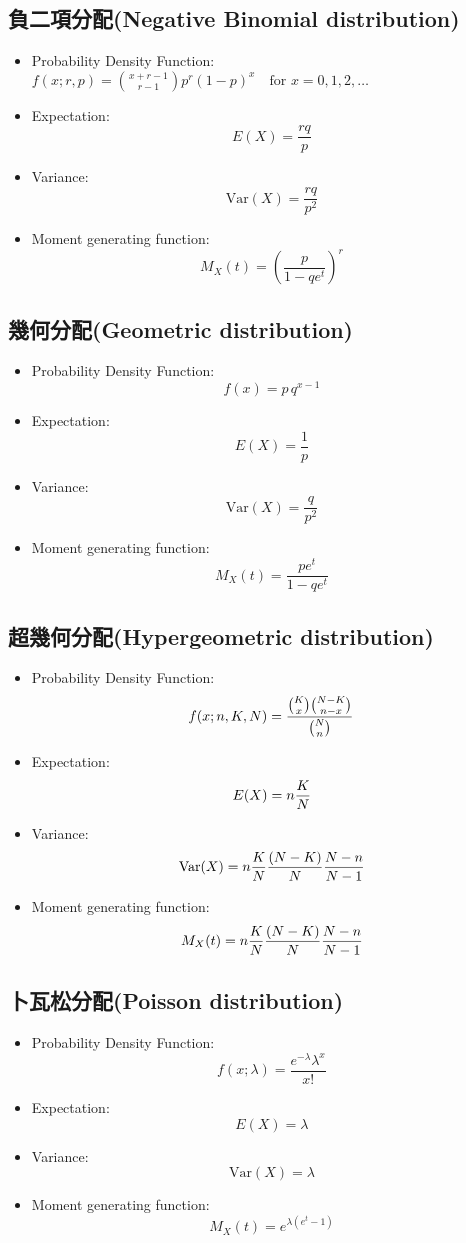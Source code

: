 \subsection{負二項分配(Negative Binomial distribution)}
\begin{itemize}
\item Probability Density Function:${\displaystyle f(x;r,p)={\binom {x+r-1}{r-1}}p^{r}(1-p)^{x}\quad {\text{for }}x=0,1,2,\dotsc }$
\item Expectation:$$E(X) = \frac{rq}{p}$$
\item Variance:$$\text{Var}(X) = \frac{rq}{p^2}$$
\item Moment generating function:$$M_X(t) = \left({\frac  {p}{1-qe^{t}}}\right)^{r}\!$$
\end{itemize}
\subsection{幾何分配(Geometric distribution)}
\begin{itemize}
\item Probability Density Function:$$f(x)=p\,q^{{x-1}}$$
\item Expectation:$$E(X) = \frac{1}{p}$$
\item Variance:$$\text{Var}(X) = \frac{q}{p^2}$$
\item Moment generating function:$$M_X(t) = {\frac  {pe^{t}}{1-qe^{t}}}\!$$
\end{itemize}
\subsection{超幾何分配(Hypergeometric distribution)}
\begin{itemize}
\item Probability Density Function:$${\displaystyle f(x;n,K,N)={{{K \choose x}{{N-K} \choose {n-x}}} \over {N \choose n}}}$$
\item Expectation:$$E(X) = {\displaystyle n{K \over N}}$$
\item Variance:$$\text{Var}(X) = {\displaystyle n{K \over N}{(N-K) \over N}{N-n \over N-1}}$$
\item Moment generating function:$$M_X(t) = {\displaystyle n{K \over N}{(N-K) \over N}{N-n \over N-1}}$$
\end{itemize}
\subsection{卜瓦松分配(Poisson distribution)}
\begin{itemize}
\item Probability Density Function:$$f(x;\lambda)=\frac{e^{-\lambda}\lambda^x}{x!}$$
\item Expectation:$$E(X) = \lambda$$
\item Variance:$$\text{Var}(X) = \lambda$$
\item Moment generating function:$$M_X(t) = e^{\lambda (e^{{t}}-1)}$$
\end{itemize}
